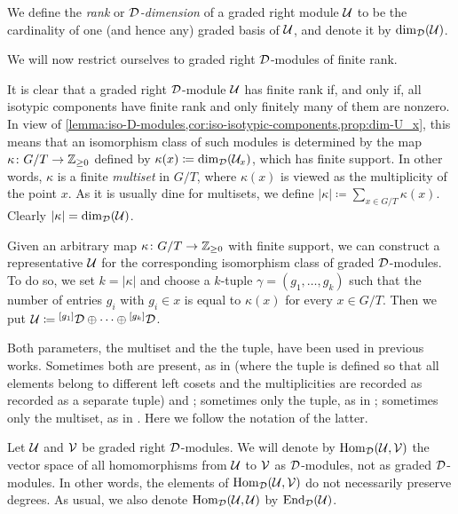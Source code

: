 \begin{defi}
    We define the \emph{rank} or \emph{$\mathcal{D}$-dimension} of a graded right module $\mathcal U$ to be the cardinality of one (and hence any) graded basis of $\mathcal U$, and denote it by $\dim_{\mathcal{D}} (\mathcal U)$.
\end{defi}

We will now restrict ourselves to graded right $\mathcal{D}$-modules of finite rank.

It is clear that a graded right $\mathcal{D}$-module $\mathcal U$ has finite rank if, and only if, all isotypic components have finite rank and only finitely many of them are nonzero. 
In view of \cref{lemma:iso-D-modules,cor:iso-isotypic-components,prop:dim-U_x}, this means that an isomorphism class of such modules is determined by the map $\kappa \colon G/T \to \mathbb{Z}_{\geq 0}$ defined by $\kappa(x) \coloneqq \dim_{\mathcal{D}} (\mathcal U_x)$, which has finite support. 
In other words, $\kappa$ is a finite \emph{multiset} in $G/T$, where $\kappa(x)$ is viewed as the multiplicity of the point $x$. 
As it is usually dine for multisets, we define $|\kappa| \coloneqq \sum_{x \in G/T} \kappa(x)$. 
Clearly $|\kappa| = \dim_{\mathcal{D}} (\mathcal U)$.

Given an arbitrary map $\kappa\colon G/T \to \mathbb{Z}_{\geq 0}$ with finite support, we can construct a representative $\mathcal U$ for the corresponding isomorphism class of graded $\mathcal{D}$-modules. 
To do so, we set $k = |\kappa|$ and choose a $k$-tuple $\gamma = (g_1, \ldots, g_k)$ such that the number of entries $g_i$ with $g_i\in x$ is equal to $\kappa (x)$ for every $x\in G/T$.
Then we put $\mathcal U \coloneqq {}^{[g_1]}\mathcal{D} \oplus \cdots \oplus {}^{[g_k]}\mathcal{D}$.

\begin{remark}
	Both parameters, the multiset and the the tuple, have been used in previous works. 
	Sometimes both are present, as in \cite{livromicha} (where the tuple is defined so that all elements belong to different left cosets and the multiplicities are recorded as recorded as a separate tuple) and \cite{paper-Qn,paper-MAP}; sometimes only the tuple, as in \cite{BK10}; sometimes only the multiset, as in \cite{paper-adrian,felipe-misha}.
	Here we follow the notation of the latter.
\end{remark}

    Let $\mathcal U$ and $\mathcal V$ be graded right $\mathcal{D}$-modules. We will denote by $\operatorname{Hom}_{\mathcal{D}}(\mathcal U,\mathcal V)$ the vector space of all homomorphisms from $\mathcal U$ to $\mathcal V$ as $\mathcal{D}$-modules, not as graded $\mathcal{D}$-modules. 
    In other words, the elements of $\operatorname{Hom}_{\mathcal{D}} (\mathcal U, \mathcal V)$ do not necessarily preserve degrees. 
    As usual, we also denote $\operatorname{Hom}_{\mathcal{D}} (\mathcal U,\mathcal U)$ by  $\operatorname{End}_{\mathcal{D}}(\mathcal U)$. 


